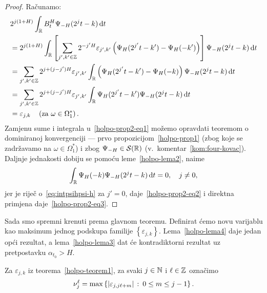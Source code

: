 \documentclass[main.tex]{subfiles}
\begin{document}
\newcommand{\grn}{_\R}
\begin{proof}
	Računamo:
	\begin{align}
		 & 2^{j(1+H)}\int\grn B^H_t\Psi_{-H}(2^jt-k) \D t                                                                                                                                \\
		 & = 2^{j(1+H)}\int\grn \left[ \sum_{j',k'\in\Z} 2^{-j'H}\varepsilon_{j',k'}\left( \Psi_H(2^{j'}t-k')-\Psi_H(-k') \right) \right] \Psi_{-H}(2^jt-k) \D t \label{holpo-prop2-eq1} \\
		 & = \sum_{j',k'\in\Z} 2^{j+(j-j')H}\varepsilon_{j',k'}
		\int\grn \left( \Psi_H(2^{j'}t-k')-\Psi_H(-k) \right)\Psi_{-H}(2^jt-k) \D t                                                                                                      \\
		 & = \sum_{j',k'\in\Z} 2^{j+(j-j')H}\varepsilon_{j',k'}
		\int\grn \Psi_H(2^{j'}t-k')\Psi_{-H}(2^jt-k) \D t \label{holpo-prop2-eq2}                                                                                                        \\
		 & = \varepsilon_{j,k} \quad \left(\text{za } \omega \in \Omega_1^*\right). \label{holpo-prop2-eq3}
	\end{align}
	Zamjenu sume i integrala u~\eqref{holpo-prop2-eq1} možemo opravdati teoremom o
	dominiranoj konvergenciji --- prvo propozicijom~\ref{holpo-prop1}
	(zbog koje se zadržavamo na \( \omega \in \Omega_1^* \)) i zbog \( \Psi_{-H} \in \mathcal S(\mathbb{R}) \)
	(v.~komentar~\ref{kom:four-kovac}). Daljnje jednakosti dobiju se pomoću leme~\ref{holpo-lema2}, naime
	\begin{equation}
		\int\grn \Psi_H(-k)\Psi_{-H}(2^jt-k) \D t = 0, \quad j \neq 0,
	\end{equation}
	jer je riječ o~\eqref{eq:intpsihpsi-h} za \( j'=0 \), daje~\eqref{holpo-prop2-eq2} i direktna primjena daje~\eqref{holpo-prop2-eq3}.
\end{proof}

Sada smo spremni krenuti prema glavnom teoremu.
Definirat ćemo novu varijablu kao maksimum
jednog podskupa familije \( \left\{ \varepsilon_{j,k} \right\} \).
Lema~\ref{holpo-lema4} daje jedan opći rezultat,
a lema~\ref{holpo-lema3} dat će kontradiktorni rezultat
uz pretpostavku \( \alpha_{t_0} > H \).

\begin{definicija}
	Za \( \varepsilon_{j,k} \) iz teorema~\ref{holpo-teorem1}, za svaki \( j \in \mathbb{N} \)
	i \( \ell \in \mathbb{Z} \) označimo
	\begin{equation}
		\nu_j^\ell = \max\left\{ \left| {\varepsilon_{j, j\ell+m}} \right| \, \colon \, 0 \le m \le j-1 \right\}.
	\end{equation}
\end{definicija}
\end{document}
